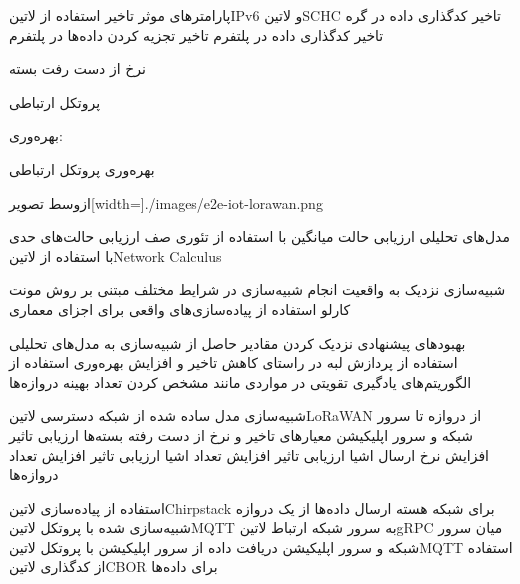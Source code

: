 \documentclass[dvipsnames]{beamer}
\begin{document}
\begin{persian}
\begin{frame}{پارامترهای موثر}
		 تاخیر استفاده از ‌لاتین{IPv6} و ‌لاتین{SCHC}
		 تاخیر کدگذاری داده در گره
		 تاخیر کدگذاری داده در پلتفرم
		 تاخیر تجزیه کردن داده‌ها در پلتفرم

		 نرخ از دست رفت بسته

		 پروتکل ارتباطی

		 بهره‌وری:

		 بهره‌وری پروتکل ارتباطی

	\end{frame}

	\begin{frame}{}
		‌ازوسط
		‌تصویر[width=\textwidth]{./images/e2e-iot-lorawan.png}
	\end{frame}

	\begin{frame}
		 مدل‌های تحلیلی
		 ارزیابی حالت میانگین با استفاده از تئوری صف
		 ارزیابی حالت‌های حدی با استفاده از ‌لاتین{Network Calculus}

		 شبیه‌سازی نزدیک به واقعیت
		 انجام شبیه‌سازی در شرایط مختلف مبتنی بر روش مونت کارلو
		 استفاده از پیاده‌سازی‌های واقعی برای اجزای معماری

		 بهبودهای پیشنهادی
		 نزدیک کردن مقادیر حاصل از شبیه‌سازی به مدل‌های تحلیلی
		 استفاده از پردازش لبه در راستای کاهش تاخیر و افزایش بهره‌وری
		 استفاده از الگوریتم‌های یادگیری تقویتی در مواردی مانند مشخص کردن تعداد بهینه دروازه‌ها
	\end{frame}

	\قسمت{شبیه‌سازی}

	\begin{frame}
		\شروع{فقرات}
		 شبیه‌سازی مدل ساده شده از شبکه دسترسی ‌لاتین{LoRaWAN} از دروازه تا سرور شبکه و سرور اپلیکیشن
		 معیارهای تاخیر و نرخ از دست رفته بسته‌ها
		 ارزیابی تاثیر افزایش نرخ ارسال اشیا
		 ارزیابی تاثیر افزایش تعداد اشیا
		 ارزیابی تاثیر افزایش تعداد دروازه‌ها
		\پایان{فقرات}
	\end{frame}

	\begin{frame}
		 استفاده از پیاده‌سازی ‌لاتین{Chirpstack} برای شبکه هسته
		 ارسال داده‌ها از یک دروازه شبیه‌سازی شده با پروتکل ‌لاتین{MQTT} به سرور شبکه
		 ارتباط ‌لاتین{gRPC} میان سرور شبکه و سرور اپلیکیشن
		 دریافت داده از سرور اپلیکیشن با پروتکل ‌لاتین{MQTT}
		 استفاده از کدگذاری ‌لاتین{CBOR} برای داده‌ها
	\end{frame}


\end{persian}
\end{document}
